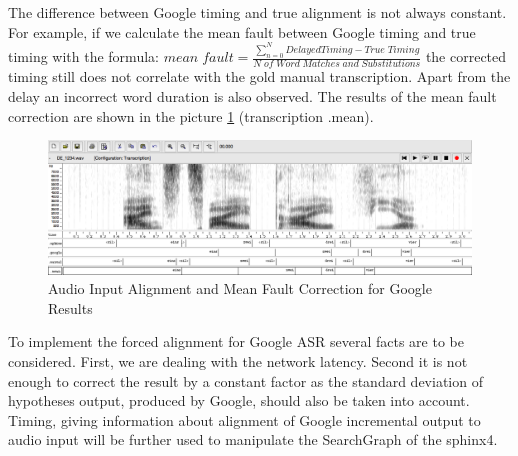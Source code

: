 % 
The difference between Google timing  and true
alignment is not always constant. For example, if we calculate the mean fault
between Google timing and true timing with the formula:
$mean\; fault=\frac{\sum_{n=0}^N Delayed
Timing-True\;Timing}{N \;of\;Word\;Matches \;and\;Substitutions}$ the
corrected timing still does not correlate with the gold manual transcription.
Apart from the delay an incorrect word duration is also observed. The results of
the mean fault correction are shown in the picture \ref {fig:Bild5} (transcription .mean).
\begin{figure}[htbp]
  \centering
     \includegraphics[width=1.0\textwidth]{images/wave3.png}
  \caption{Audio Input Alignment and Mean Fault Correction for Google Results}
  \label{fig:Bild5}
\end{figure}
To implement the forced alignment for Google ASR several facts are to be
considered. First, we are dealing with the network latency. 
Second it is not enough to correct the result by a constant factor as the
standard deviation of hypotheses output, produced by Google, should also be taken into account. 
Timing, giving information about alignment of Google incremental output
to audio input will be further used to manipulate the SearchGraph of the
sphinx4.

